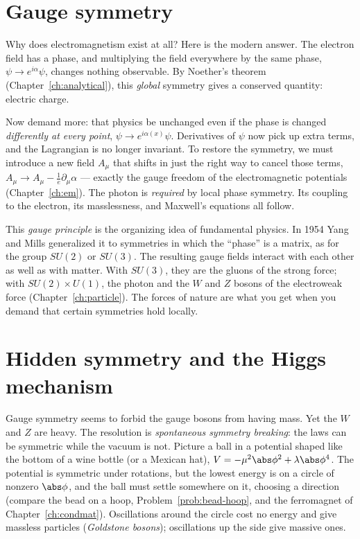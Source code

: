 \section{Gauge symmetry}

Why does electromagnetism exist at all? Here is the modern answer. The electron field has a phase, and multiplying the field everywhere by the same phase, $\psi\to e^{i\alpha}\psi$, changes nothing observable. By Noether's theorem (Chapter~\ref{ch:analytical}), this \emph{global} symmetry gives a conserved quantity: electric charge.

Now demand more: that physics be unchanged even if the phase is changed \emph{differently at every point}, $\psi\to e^{i\alpha(x)}\psi$. Derivatives of $\psi$ now pick up extra terms, and the Lagrangian is no longer invariant. To restore the symmetry, we must introduce a new field $A_\mu$ that shifts in just the right way to cancel those terms, $A_\mu\to A_\mu - \tfrac1e\partial_\mu\alpha$ --- exactly the gauge freedom of the electromagnetic potentials (Chapter~\ref{ch:em}). The photon is \emph{required} by local phase symmetry. Its coupling to the electron, its masslessness, and Maxwell's equations all follow.

This \emph{gauge principle} is the organizing idea of fundamental physics. In 1954 Yang and Mills generalized it to symmetries in which the ``phase'' is a matrix, as for the group $SU(2)$ or $SU(3)$. The resulting gauge fields interact with each other as well as with matter. With $SU(3)$, they are the gluons of the strong force; with $SU(2)\times U(1)$, the photon and the $W$ and $Z$ bosons of the electroweak force (Chapter~\ref{ch:particle}). The forces of nature are what you get when you demand that certain symmetries hold locally.

\section{Hidden symmetry and the Higgs mechanism}

Gauge symmetry seems to forbid the gauge bosons from having mass. Yet the $W$ and $Z$ are heavy. The resolution is \emph{spontaneous symmetry breaking}: the laws can be symmetric while the vacuum is not. Picture a ball in a potential shaped like the bottom of a wine bottle (or a Mexican hat), $V = -\mu^2\abs\phi^2 + \lambda\abs\phi^4$. The potential is symmetric under rotations, but the lowest energy is on a circle of nonzero $\abs\phi$, and the ball must settle somewhere on it, choosing a direction (compare the bead on a hoop, Problem~\ref{prob:bead-hoop}, and the ferromagnet of Chapter~\ref{ch:condmat}). Oscillations around the circle cost no energy and give massless particles (\emph{Goldstone bosons}); oscillations up the side give massive ones.

